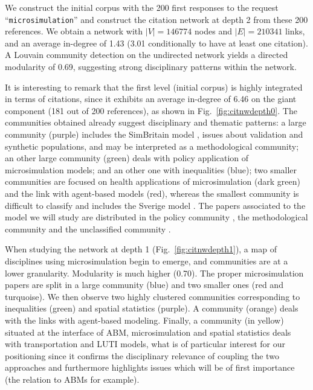 We construct the initial corpus with the 200 first responses to the request ``\texttt{microsimulation}'' and construct the citation network at depth 2 from these 200 references. We obtain a network with $\left|V\right|=146774$ nodes and $\left|E\right|=210341$ links, and an average in-degree of 1.43 (3.01 conditionally to have at least one citation). A Louvain community detection on the undirected network yields a directed modularity of 0.69, suggesting strong disciplinary patterns within the network.  

It is interesting to remark that the first level (initial corpus) is highly integrated in terms of citations, since it exhibits an average in-degree of 6.46 on the giant component (181 out of 200 references), as shown in Fig.~\ref{fig:citnwdepth0}. The communities obtained already suggest disciplinary and thematic patterns: a large community (purple) includes the SimBritain model \cite{ballas2005simbritain}, issues about validation and synthetic populations, and may be interpreted as a methodological community; an other large community (green) deals with policy application of microsimulation models; and an other one with inequalities (blue); two smaller communities are focused on health applications of microsimulation (dark green) and the link with agent-based models (red), whereas the smallest community is difficult to classify and includes the Sverige model \cite{holm2002sverige}. The papers associated to the model we will study are distributed in the policy community \cite{wu2012moses}, the methodological community \cite{townend2009moses} and the unclassified community \cite{rees2017moses}.

When studying the network at depth 1 (Fig.~\ref{fig:citnwdepth1}), a map of disciplines using microsimulation begin to emerge, and communities are at a lower granularity. Modularity is much higher (0.70). The proper microsimulation papers are split in a large community (blue) and two smaller ones (red and turquoise). We then observe two highly clustered communities corresponding to inequalities (green) and spatial statistics (purple). A community (orange) deals with the links with agent-based modeling. Finally, a community (in yellow) situated at the interface of ABM, microsimulation and spatial statistics deals with transportation and LUTI models, what is of particular interest for our positioning since it confirms the disciplinary relevance of coupling the two approaches and furthermore highlights issues which will be of first importance (the relation to ABMs for example).


